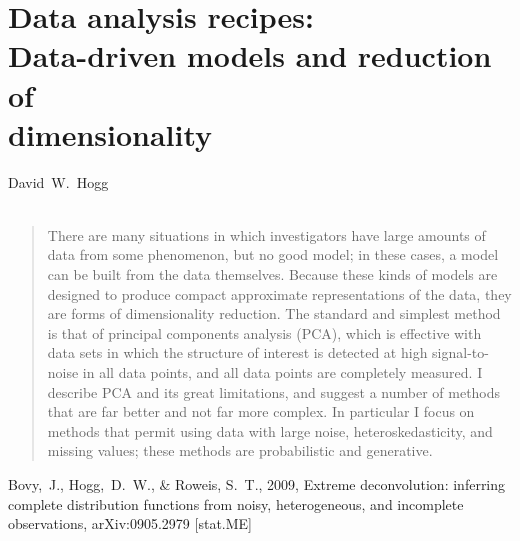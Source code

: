 \documentclass[12pt,twoside]{article}
\begin{document}
\thispagestyle{plain}\raggedbottom
\section*{Data analysis recipes:\ \\
  Data-driven models and reduction of \\ dimensionality}


\noindent
David~W.~Hogg\\
\\

\begin{abstract}
There are many situations in which investigators have large amounts of
data from some phenomenon, but no good model; in these cases, a model
can be built from the data themselves.  Because these kinds of models
are designed to produce compact approximate representations of the
data, they are forms of dimensionality reduction.  The standard and
simplest method is that of principal components analysis (PCA), which
is effective with data sets in which the structure of interest is
detected at high signal-to-noise in all data points, and all data
points are completely measured.  I describe PCA and its great
limitations, and suggest a number of methods that are far better and
not far more complex.  In particular I focus on methods that permit
using data with large noise, heteroskedasticity, and missing values;
these methods are probabilistic and generative.
\end{abstract}

\clearpage
{}\theendnotes

\clearpage
\begin{thebibliography}{}
  Bovy,~J., Hogg,~D.~W., \& Roweis, S.~T., 2009,
  Extreme deconvolution: inferring complete distribution functions from noisy, heterogeneous, and incomplete observations, 
  arXiv:0905.2979 [stat.ME]
\end{thebibliography}
\end{document}
